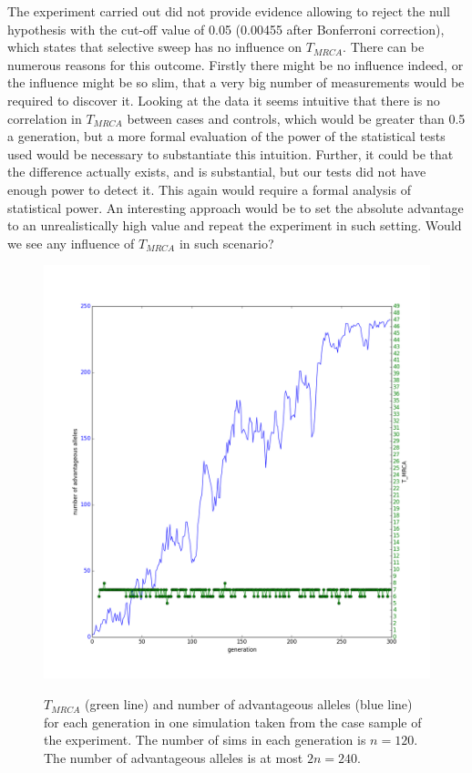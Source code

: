 \documentclass{l4proj}
\begin{document}
The experiment carried out did not provide evidence allowing to reject the null hypothesis with the cut-off value of 0.05 (0.00455 after Bonferroni correction), which states that selective sweep has no influence on $T_{MRCA}$. There can be numerous reasons for this outcome. Firstly there might be no influence indeed, or the influence might be so slim, that a very big number of measurements would be required to discover it. Looking at the data it seems intuitive that there is no correlation in $T_{MRCA}$ between cases and controls, which would be greater than 0.5 a generation, but a more formal evaluation of the power of the statistical tests used would be necessary to substantiate this intuition. Further, it could be that the difference actually exists, and is substantial, but our tests did not have enough power to detect it. This again would require a formal analysis of statistical power. An interesting approach would be to set the absolute advantage to an unrealistically high value and repeat the experiment in such setting. Would we see any influence of $T_{MRCA}$ in such scenario?

\begin{figure}
\centering
\includegraphics[scale=0.5]{slowEvolutionLabels.png}
\label{slowEvolution}
\caption{$T_{MRCA}$ (green line) and number of advantageous alleles (blue line) for each generation in one simulation taken from the case sample of the experiment. The number of sims in each generation is $n=120$. The number of advantageous alleles is at most $2n=240$.}
\end{figure}
\end{document}
